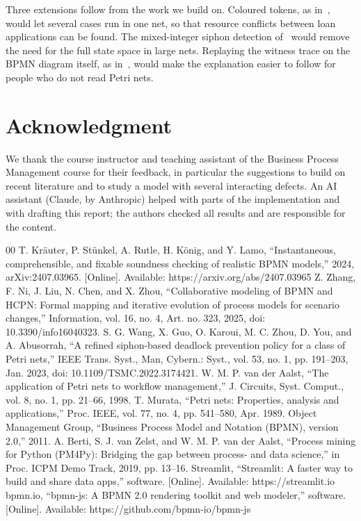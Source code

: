 \documentclass[conference]{IEEEtran}
\begin{document}
Three extensions follow from the work we build on. Coloured tokens, as in~\cite{zhang}, would let several cases
run in one net, so that resource conflicts between loan applications can be found. The mixed-integer siphon
detection of~\cite{wang} would remove the need for the full state space in large nets. Replaying the witness
trace on the BPMN diagram itself, as in~\cite{kraeuter}, would make the explanation easier to follow for people
who do not read Petri nets.

\section*{Acknowledgment}
We thank the course instructor and teaching assistant of the Business Process Management course for their
feedback, in particular the suggestions to build on recent literature and to study a model with several
interacting defects. An AI assistant (Claude, by Anthropic) helped with parts of the implementation and with
drafting this report; the authors checked all results and are responsible for the content.

\begin{thebibliography}{00}
 T. Kr\"auter, P. St\"unkel, A. Rutle, H. K\"onig, and Y. Lamo, ``Instantaneous,
comprehensible, and fixable soundness checking of realistic BPMN models,'' 2024, arXiv:2407.03965. [Online].
Available: https://arxiv.org/abs/2407.03965
 Z. Zhang, F. Ni, J. Liu, N. Chen, and X. Zhou, ``Collaborative modeling of BPMN and HCPN: Formal
mapping and iterative evolution of process models for scenario changes,'' Information, vol. 16, no. 4, Art. no.
323, 2025, doi: 10.3390/info16040323.
 S. G. Wang, X. Guo, O. Karoui, M. C. Zhou, D. You, and A. Abusorrah, ``A refined siphon-based
deadlock prevention policy for a class of Petri nets,'' IEEE Trans. Syst., Man, Cybern.: Syst., vol. 53, no. 1,
pp. 191--203, Jan. 2023, doi: 10.1109/TSMC.2022.3174421.
 W. M. P. van der Aalst, ``The application of Petri nets to workflow management,'' J. Circuits,
Syst. Comput., vol. 8, no. 1, pp. 21--66, 1998.
 T. Murata, ``Petri nets: Properties, analysis and applications,'' Proc. IEEE, vol. 77, no. 4,
pp. 541--580, Apr. 1989.
 Object Management Group, ``Business Process Model and Notation (BPMN), version 2.0,'' 2011.
 A. Berti, S. J. van Zelst, and W. M. P. van der Aalst, ``Process mining for Python (PM4Py):
Bridging the gap between process- and data science,'' in Proc. ICPM Demo Track, 2019, pp. 13--16.
 Streamlit, ``Streamlit: A faster way to build and share data apps,'' software. [Online].
Available: https://streamlit.io
 bpmn.io, ``bpmn-js: A BPMN 2.0 rendering toolkit and web modeler,'' software. [Online].
Available: https://github.com/bpmn-io/bpmn-js
\end{thebibliography}
\end{document}
